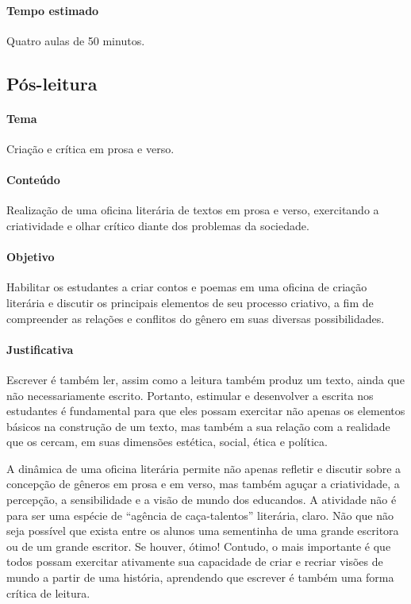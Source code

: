 \documentclass[12pt]{extarticle}
\begin{document}
\paragraph{Tempo estimado} Quatro aulas de 50 minutos.

\subsection{Pós-leitura}

\paragraph{Tema} Criação e crítica em prosa e verso.

\paragraph{Conteúdo} Realização de uma oficina literária de textos em
prosa e verso, exercitando a criatividade e olhar crítico diante dos
problemas da sociedade.

\paragraph{Objetivo} Habilitar os estudantes a criar contos e poemas em
uma oficina de criação literária e discutir os principais elementos de
seu processo criativo, a fim de compreender as relações e conflitos do
gênero em suas diversas possibilidades.

\paragraph{Justificativa} Escrever é também ler, assim como a leitura
também produz um texto, ainda que não necessariamente escrito. Portanto,
estimular e desenvolver a escrita nos estudantes é fundamental para que
eles possam exercitar não apenas os elementos básicos na construção de
um texto, mas também a sua relação com a realidade que os cercam, em
suas dimensões estética, social, ética e política.

A dinâmica de uma oficina literária permite não apenas refletir e
discutir sobre a concepção de gêneros em prosa e em verso, mas também
aguçar a criatividade, a percepção, a sensibilidade e a visão de mundo
dos educandos. A atividade não é para ser uma espécie de ``agência de
caça-talentos'' literária, claro. Não que não seja possível que exista
entre os alunos uma sementinha de uma grande escritora ou de um grande
escritor. Se houver, ótimo! Contudo, o mais importante é que todos
possam exercitar ativamente sua capacidade de criar e recriar visões de
mundo a partir de uma história, aprendendo que escrever é também uma
forma crítica de leitura.
\end{document}
